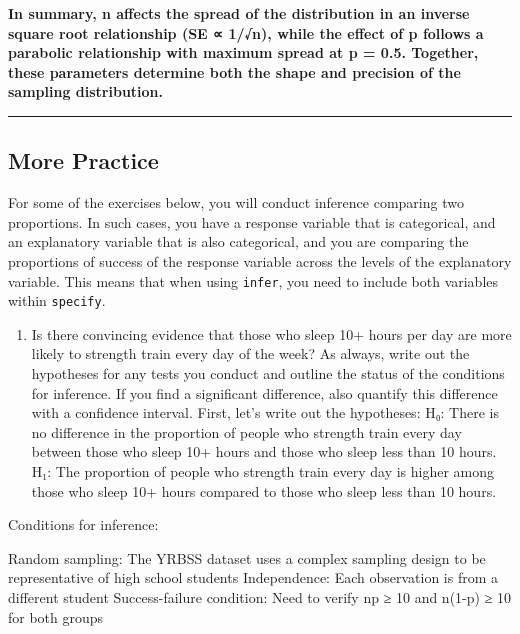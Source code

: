 \documentclass[
]{article}
\providecommand{\tightlist}{%
  \setlength{\itemsep}{0pt}\setlength{\parskip}{0pt}}
\begin{document}
\textbf{In summary, n affects the spread of the distribution in an
inverse square root relationship (SE ∝ 1/√n), while the effect of p
follows a parabolic relationship with maximum spread at p = 0.5.
Together, these parameters determine both the shape and precision of the
sampling distribution.}

\begin{center}\rule{0.5\linewidth}{0.5pt}\end{center}

\subsection{More Practice}\label{more-practice}

For some of the exercises below, you will conduct inference comparing
two proportions. In such cases, you have a response variable that is
categorical, and an explanatory variable that is also categorical, and
you are comparing the proportions of success of the response variable
across the levels of the explanatory variable. This means that when
using \texttt{infer}, you need to include both variables within
\texttt{specify}.

\begin{enumerate}
\def\labelenumi{\arabic{enumi}.}
\setcounter{enumi}{8}
\tightlist
\item
  Is there convincing evidence that those who sleep 10+ hours per day
  are more likely to strength train every day of the week? As always,
  write out the hypotheses for any tests you conduct and outline the
  status of the conditions for inference. If you find a significant
  difference, also quantify this difference with a confidence interval.
  First, let's write out the hypotheses: H₀: There is no difference in
  the proportion of people who strength train every day between those
  who sleep 10+ hours and those who sleep less than 10 hours. H₁: The
  proportion of people who strength train every day is higher among
  those who sleep 10+ hours compared to those who sleep less than 10
  hours.
\end{enumerate}

Conditions for inference:

Random sampling: The YRBSS dataset uses a complex sampling design to be
representative of high school students Independence: Each observation is
from a different student Success-failure condition: Need to verify np ≥
10 and n(1-p) ≥ 10 for both groups
\end{document}
